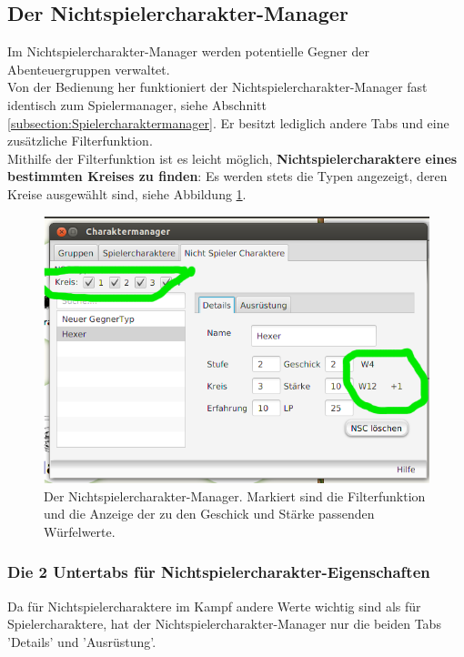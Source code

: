 \documentclass[11pt, a4paper, german]{article}
\begin{document}
\subsection{Der Nichtspielercharakter-Manager}
Im Nichtspielercharakter-Manager werden potentielle Gegner der Abenteuergruppen verwaltet. \\

Von der Bedienung her funktioniert der Nichtspielercharakter-Manager fast identisch zum Spielermanager, siehe Abschnitt \ref{subsection:Spielercharaktermanager}. Er besitzt lediglich andere Tabs und eine zusätzliche Filterfunktion.\\

Mithilfe der Filterfunktion ist es leicht möglich, \textbf{Nichtspielercharaktere eines bestimmten Kreises zu finden}: Es werden stets die Typen angezeigt, deren Kreise ausgewählt sind, siehe Abbildung \ref{fig:Nichtspielertypmanager1}.
\begin{figure}
\centering
\includegraphics[width=1\linewidth]{Bilder/Nichtspielertypmanager1}
\caption{Der Nichtspielercharakter-Manager. Markiert sind die Filterfunktion und die Anzeige der zu den Geschick und Stärke passenden Würfelwerte.}
\label{fig:Nichtspielertypmanager1}
\end{figure}


\subsubsection{Die 2 Untertabs für Nichtspielercharakter-Eigenschaften}
Da für Nichtspielercharaktere im Kampf andere Werte wichtig sind als für Spielercharaktere, hat der Nichtspielercharakter-Manager nur die beiden Tabs 'Details' und 'Ausrüstung'.\\
\end{document}
